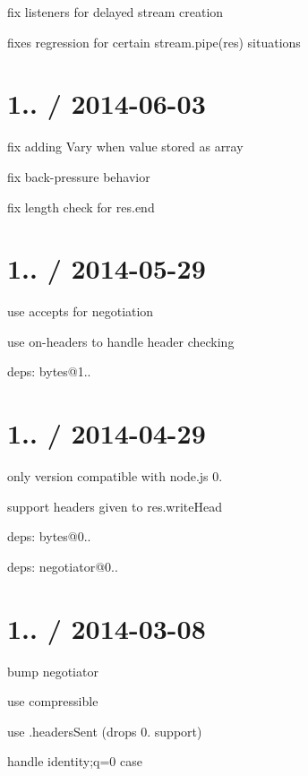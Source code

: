 \begin{DoxyItemize}
\item fix listeners for delayed stream creation
\begin{DoxyItemize}
\item fixes regression for certain {\ttfamily stream.\+pipe(res)} situations
\end{DoxyItemize}
\end{DoxyItemize}

\section*{1.. / 2014-\/06-\/03 }


\begin{DoxyItemize}
\item fix adding {\ttfamily Vary} when value stored as array
\item fix back-\/pressure behavior
\item fix length check for {\ttfamily res.\+end}
\end{DoxyItemize}

\section*{1.. / 2014-\/05-\/29 }


\begin{DoxyItemize}
\item use {\ttfamily accepts} for negotiation
\item use {\ttfamily on-\/headers} to handle header checking
\item deps\+: bytes@1..
\end{DoxyItemize}

\section*{1.. / 2014-\/04-\/29 }


\begin{DoxyItemize}
\item only version compatible with node.\+js 0.
\item support headers given to {\ttfamily res.\+write\+Head}
\item deps\+: bytes@0..
\item deps\+: negotiator@0..
\end{DoxyItemize}

\section*{1.. / 2014-\/03-\/08 }


\begin{DoxyItemize}
\item bump negotiator
\item use compressible
\item use .headers\+Sent (drops 0. support)
\item handle identity;q=0 case 
\end{DoxyItemize}